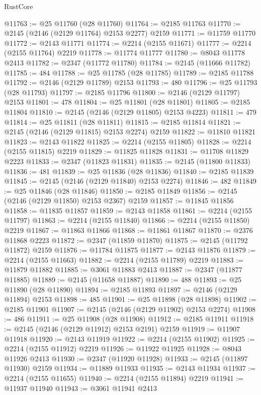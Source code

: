 \begin{lexlean}{RustCore}
\begin{coremodule}
@11763 := @25 @11760 (@28 @11760)
@11764 := @2185 @11763
@11770 := @2145 (@2146 (@2129 @11764) @2153 @2277) @2159
@11771 := @11759 @11770
@11772 := @2143 @11771
@11774 := @2214 (@2155 @11671)
@11777 := @2214 (@2155 @11764) @2219
@11778 := @11774 @11777
@11780 := @8043 @11778 @2413
@11782 := @2347 (@11772 @11780)
@11784 := @2145 (@11666 @11782)
@11785 := 484
@11788 := @25 @11785 (@28 @11785)
@11789 := @2185 @11788
@11792 := @2146 (@2129 @11789) @2153
@11793 := 480
@11796 := @25 @11793 (@28 @11793)
@11797 := @2185 @11796
@11800 := @2146 (@2129 @11797) @2153
@11801 := 478
@11804 := @25 @11801 (@28 @11801)
@11805 := @2185 @11804
@11810 := @2145 (@2146 (@2129 @11805) @2153 @4223)
@11811 := 479
@11814 := @25 @11811 (@28 @11811)
@11815 := @2185 @11814
@11821 := @2145 (@2146 (@2129 @11815) @2153 @2274) @2159
@11822 := @11810 @11821
@11823 := @2143 @11822
@11825 := @2214 (@2155 @11805)
@11828 := @2214 (@2155 @11815) @2219
@11829 := @11825 @11828
@11831 := @11708 @11829 @2223
@11833 := @2347 (@11823 @11831)
@11835 := @2145 (@11800 @11833)
@11836 := 481
@11839 := @25 @11836 (@28 @11836)
@11840 := @2185 @11839
@11845 := @2145 (@2146 (@2129 @11840) @2153 @2274)
@11846 := 482
@11849 := @25 @11846 (@28 @11846)
@11850 := @2185 @11849
@11856 := @2145 (@2146 (@2129 @11850) @2153 @2367) @2159
@11857 := @11845 @11856
@11858 := @11835 @11857
@11859 := @2143 @11858
@11861 := @2214 (@2155 @11797)
@11863 := @2214 (@2155 @11840)
@11866 := @2214 (@2155 @11850) @2219
@11867 := @11863 @11866
@11868 := @11861 @11867
@11870 := @2376 @11868 @2223
@11872 := @2347 (@11859 @11870)
@11875 := @2145 (@11792 @11872) @2159
@11876 := @11784 @11875
@11877 := @2143 @11876
@11879 := @2214 (@2155 @11663)
@11882 := @2214 (@2155 @11789) @2219
@11883 := @11879 @11882
@11885 := @3061 @11883 @2413
@11887 := @2347 (@11877 @11885)
@11889 := @2145 (@11658 @11887)
@11890 := 488
@11893 := @25 @11890 (@28 @11890)
@11894 := @2185 @11893
@11897 := @2146 (@2129 @11894) @2153
@11898 := 485
@11901 := @25 @11898 (@28 @11898)
@11902 := @2185 @11901
@11907 := @2145 (@2146 (@2129 @11902) @2153 @2274)
@11908 := 486
@11911 := @25 @11908 (@28 @11908)
@11912 := @2185 @11911
@11918 := @2145 (@2146 (@2129 @11912) @2153 @2191) @2159
@11919 := @11907 @11918
@11920 := @2143 @11919
@11922 := @2214 (@2155 @11902)
@11925 := @2214 (@2155 @11912) @2219
@11926 := @11922 @11925
@11928 := @8043 @11926 @2413
@11930 := @2347 (@11920 @11928)
@11933 := @2145 (@11897 @11930) @2159
@11934 := @11889 @11933
@11935 := @2143 @11934
@11937 := @2214 (@2155 @11655)
@11940 := @2214 (@2155 @11894) @2219
@11941 := @11937 @11940
@11943 := @3061 @11941 @2413

\end{coremodule}
\end{lexlean}
